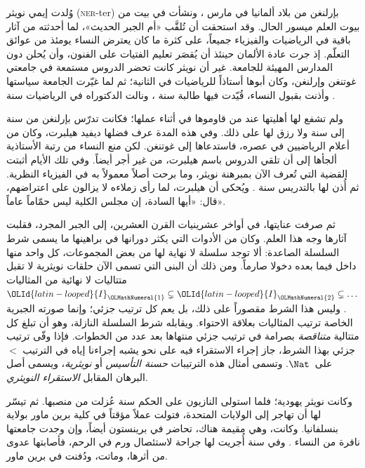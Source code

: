 \documentclass[../../../include/open-logic-section]{subfiles}
\begin{document}



وُلدت إيمي نويثر (\textsc{ner}-ter) بإرلنغن من بلاد ألمانيا في  مارس
، ونشأت في بيت من بيوت العلم ميسور الحال. وقد استحقت أن تُلقَّب «أم
الجبر الحديث»، لما أحدثته من آثار باقية في الرياضيات والفيزياء جميعاً،
على كثرة ما كان يعترض النساء يومئذ من عوائق التعلّم. إذ جرت عادة الألمان
حينئذ أن يُقصَر تعليم الفتيات على الفنون، وأن يُحلن دون المدارس المهيئة
للجامعة. غير أن نويثر كانت تحضر الدروس مستمعة في جامعتي غوتنغن وإرلنغن،
وكان أبوها أستاذاً للرياضيات في الثانية؛ ثم لما غيّرت الجامعة سياستها
وأذنت بقبول النساء، قُيّدت فيها طالبة سنة ، ونالت الدكتوراه في
الرياضيات سنة .

ولم تشفع لها أهليتها عند من قاوموها في أثناء عملها؛ فكانت تدرّس بإرلنغن
من سنة  إلى سنة  ولا رزق لها على ذلك. وفي هذه المدة عرف فضلها
ديفيد هيلبرت، وكان من أعلام الرياضيين في عصره، فاستدعاها إلى غوتنغن. لكن
منع النساء من رتبة الأستاذية ألجأها إلى أن تلقي الدروس باسم هيلبرت، من غير
أجر أيضاً. وفي تلك الأيام أثبتت القضية التي تُعرف الآن بمبرهنة نويثر، وما
برحت أصلاً معمولاً به في الفيزياء النظرية. ثم أُذن لها بالتدريس سنة .
ويُحكى أن هيلبرت، لما رأى زملاءه لا يزالون على اعتراضهم، قال: «أيها
السادة، إن مجلس الكلية ليس حمّاماً عاماً».

ثم صرفت عنايتها، في أواخر عشرينيات القرن العشرين، إلى الجبر المجرد، فقلبت
آثارها وجه هذا العلم. وكان من الأدوات التي يكثر دورانها في براهينها ما
يسمى شرط السلسلة الصاعدة: ألا توجد سلسلة لا نهاية لها من بعض المجموعات،
كل واحد منها داخل فيما بعده دخولا صارماً. ومن ذلك أن البنى التي تسمى الآن
حلقات نويثرية لا تقبل متتاليات لا نهائية من المثاليات
${\OLId{latin-looped}{I}}_{\OLMathNumeral{1}} \subsetneq {\OLId{latin-looped}{I}}_{\OLMathNumeral{2}} \subsetneq \dots$. وليس هذا الشرط مقصوراً على ذلك،
بل يعم كل ترتيب جزئي؛ وإنما صورته الجبرية الخاصة ترتيب المثاليات بعلاقة
الاحتواء. ويقابله شرط السلسلة النازلة، وهو أن تبلغ كل متتالية
\emph{متناقصة} بصرامة في ترتيب جزئي منتهاها بعد عدد من الخطوات. فإذا وفّى
ترتيب جزئي بهذا الشرط، جاز إجراء الاستقراء فيه على نحو يشبه إجراءنا إياه
في الترتيب $<$ على~$\Nat$. وتسمى أمثال هذه الترتيبات \emph{حسنة
التأسيس} أو \emph{نويثرية}، ويسمى أصل البرهان المقابل \emph{الاستقراء
النويثري}.

وكانت نويثر يهودية؛ فلما استولى النازيون على الحكم سنة  عُزلت من
منصبها. ثم تيسّر لها أن تهاجر إلى الولايات المتحدة، فتولت عملاً مؤقتاً في
كلية برين ماور بولاية بنسلفانيا. وكانت، وهي مقيمة هناك، تحاضر في برينستون
أيضاً، وإن وجدت جامعتها نافرة من النساء \citep[81]{Dick1981}. وفي سنة
 أُجريت لها جراحة لاستئصال ورم في الرحم، فأصابتها عدوى من أثرها،
وماتت، ودُفنت في برين ماور.
\end{document}
